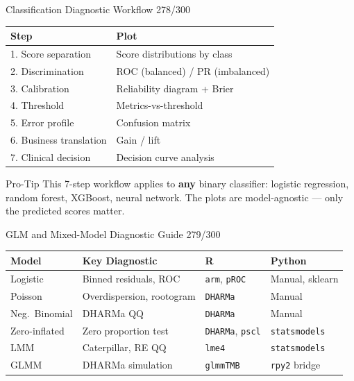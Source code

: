 \documentclass[10pt]{beamer}
\newcommand{\smark}[1]{\hfill{\scriptsize\color{codegray}#1}}
\begin{document}
\begin{frame}{Classification Diagnostic Workflow}
\smark{278/300}
\centering\small
\begin{tabular}{@{}ll@{}}
    \toprule
    \textbf{Step} & \textbf{Plot} \\
    \midrule
    1. Score separation      & Score distributions by class \\
    2. Discrimination        & ROC (balanced) / PR (imbalanced) \\
    3. Calibration           & Reliability diagram + Brier \\
    4. Threshold             & Metrics-vs-threshold \\
    5. Error profile         & Confusion matrix \\
    6. Business translation  & Gain / lift \\
    7. Clinical decision     & Decision curve analysis \\
    \bottomrule
\end{tabular}

\vspace{0.3cm}
\begin{alertblock}{Pro-Tip}
    \scriptsize This 7-step workflow applies to \textbf{any} binary classifier: logistic regression, random forest, XGBoost, neural network. The plots are model-agnostic --- only the predicted scores matter.
\end{alertblock}
\end{frame}

\begin{frame}{GLM and Mixed-Model Diagnostic Guide}
\smark{279/300}
\centering\small
\begin{tabular}{@{}llll@{}}
    \toprule
    \textbf{Model} & \textbf{Key Diagnostic} & \textbf{R} & \textbf{Python} \\
    \midrule
    Logistic         & Binned residuals, ROC    & \texttt{arm}, \texttt{pROC}      & Manual, sklearn \\
    Poisson          & Overdispersion, rootogram & \texttt{DHARMa}               & Manual \\
    Neg.\ Binomial   & DHARMa QQ                & \texttt{DHARMa}               & Manual \\
    Zero-inflated    & Zero proportion test      & \texttt{DHARMa}, \texttt{pscl} & \texttt{statsmodels} \\
    LMM              & Caterpillar, RE QQ        & \texttt{lme4}                 & \texttt{statsmodels} \\
    GLMM             & DHARMa simulation         & \texttt{glmmTMB}              & \texttt{rpy2} bridge \\
    \bottomrule
\end{tabular}
\end{frame}
\end{document}
